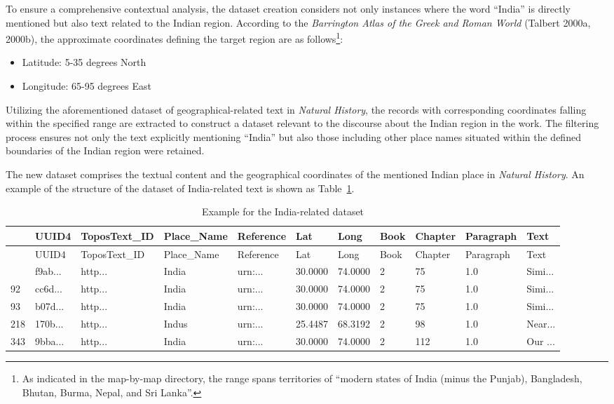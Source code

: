\documentclass[
  12pt,
]{article}
\providecommand{\tightlist}{%
  \setlength{\itemsep}{0pt}\setlength{\parskip}{0pt}}\usepackage{longtable,booktabs,array}
\begin{document}
To ensure a comprehensive contextual analysis, the dataset creation
considers not only instances where the word ``India'' is directly
mentioned but also text related to the Indian region. According to the
\emph{Barrington Atlas of the Greek and Roman World} (Talbert 2000a,
2000b), the approximate coordinates defining the target region are as
follows\footnote{As indicated in the map-by-map directory, the range
  spans territories of ``modern states of India (minus the Punjab),
  Bangladesh, Bhutan, Burma, Nepal, and Sri Lanka''.}:

\begin{itemize}
\tightlist
\item
  Latitude: 5-35 degrees North
\item
  Longitude: 65-95 degrees East
\end{itemize}

Utilizing the aforementioned dataset of geographical-related text in
\emph{Natural History}, the records with corresponding coordinates
falling within the specified range are extracted to construct a dataset
relevant to the discourse about the Indian region in the work. The
filtering process ensures not only the text explicitly mentioning
``India'' but also those including other place names situated within the
defined boundaries of the Indian region were retained.

The new dataset comprises the textual content and the geographical
coordinates of the mentioned Indian place in \emph{Natural History}. An
example of the structure of the dataset of India-related text is shown
as Table~\ref{tbl-dataset_indiatext}.

\hypertarget{tbl-dataset_indiatext}{}
\begin{longtable}[]{@{}lllllllllll@{}}
\caption{\label{tbl-dataset_indiatext}Example for the India-related
dataset}\tabularnewline
\toprule\noalign{}
& UUID4 & ToposText\_ID & Place\_Name & Reference & Lat & Long & Book &
Chapter & Paragraph & Text \\
\midrule\noalign{}
\endfirsthead
\toprule\noalign{}
& UUID4 & ToposText\_ID & Place\_Name & Reference & Lat & Long & Book &
Chapter & Paragraph & Text \\
\midrule\noalign{}
\endhead
\bottomrule\noalign{}
\endlastfoot
85 & f9ab... & http... & India & urn:... & 30.0000 & 74.0000 & 2 & 75 &
1.0 & Simi... \\
92 & cc6d... & http... & India & urn:... & 30.0000 & 74.0000 & 2 & 75 &
1.0 & Simi... \\
93 & b07d... & http... & India & urn:... & 30.0000 & 74.0000 & 2 & 75 &
1.0 & Simi... \\
218 & 170b... & http... & Indus & urn:... & 25.4487 & 68.3192 & 2 & 98 &
1.0 & Near... \\
343 & 9bba... & http... & India & urn:... & 30.0000 & 74.0000 & 2 & 112
& 1.0 & Our ... \\
\end{longtable}
\end{document}

